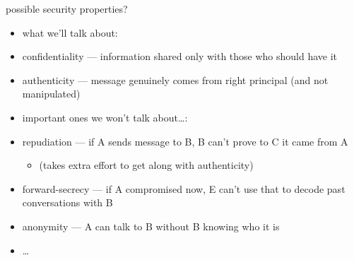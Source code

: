 \begin{frame}{possible security properties?}
    \begin{itemize}
    \item what we'll talk about: 
    \item confidentiality --- information shared only with those who should have it
    \item authenticity --- message genuinely comes from right principal (and not manipulated)
    \vspace{.5cm}
    \item important ones we won't talk about\ldots:
    \item repudiation --- if A sends message to B, B can't prove to C it came from A
        \begin{itemize}
        \item (takes extra effort to get along with authenticity)
        \end{itemize}
    \item forward-secrecy --- if A compromised now, E can't use that to decode past conversations with B
    \item anonymity --- A can talk to B without B knowing who it is
    \item \ldots
    \end{itemize}
\end{frame}


